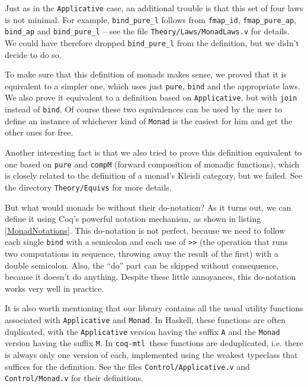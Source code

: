 \documentclass[declaration,inz,english,shortabstract]{iithesis}
\newcommand{\libname}{\m{coq-mtl}}
\newcommand{\m}[1]{\texttt{#1}}
\begin{document}
Just as in the \m{Applicative} case, an additional trouble is that this set of four laws is not minimal. For example, \m{bind\_pure\_l} follows from \m{fmap\_id}, \m{fmap\_pure\_ap}, \m{bind\_ap} and \m{bind\_pure\_l} -- see the file \m{Theory/Laws/MonadLaws.v} for details. We could have therefore dropped \m{bind\_pure\_l} from the definition, but we didn't decide to do so.

To make sure that this definition of monads makes sense, we proved that it is equivalent to a simpler one, which uses just \m{pure}, \m{bind} and the appropriate laws. We also prove it equivalent to a definition based on \m{Applicative}, but with \m{join} instead of \m{bind}. Of course these two equivalences can be used by the user to define an instance of whichever kind of \m{Monad} is the easiest for him and get the other ones for free.

Another interesting fact is that we also tried to prove this definition equivalent to one based on \m{pure} and \m{compM} (forward composition of monadic functions), which is closely related to the definition of a monad's Kleisli category, but we failed. See the directory \m{Theory/Equivs} for more details.


But what would monads be without their do-notation? As it turns out, we can define it using Coq's powerful notation mechanism, as shown in listing \ref{MonadNotations}. This do-notation is not perfect, because we need to follow each single \m{bind} with a semicolon and each use of \m{>>} (the operation that runs two computations in sequence, throwing away the result of the first) with a double semicolon. Also, the ``do'' part can be skipped without consequence, because it doesn't do anything. Despite these little annoyances, this do-notation works very well in practice.

It is also worth mentioning that our library contains all the usual utility functions associated with \m{Applicative} and \m{Monad}. In Haskell, these functions are often duplicated, with the \m{Applicative} version having the suffix \m{A} and the \m{Monad} version having the suffix \m{M}. In \libname\ these functions are deduplicated, i.e. there is always only one version of each, implemented using the weakest typeclass that suffices for the definition. See the files \m{Control/Applicative.v} and \m{Control/Monad.v} for their definitions.
\end{document}
